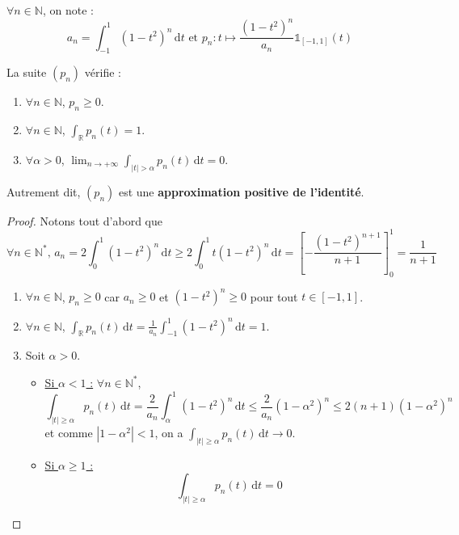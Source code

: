 






  \begin{notation}
    $\forall n \in \mathbb{N}$, on note :
    \[ a_n = \int_{-1}^1 (1-t^2)^n \, \mathrm{d}t \text{ et } p_n : t \mapsto \frac{(1-t^2)^n}{a_n} \mathbb{1}_{[-1, 1]}(t) \]
  \end{notation}

  \begin{lemma}
    \label{theoreme-de-weierstrass-par-la-convolution-1}
    La suite $(p_n)$ vérifie :
    \begin{enumerate}[label={\bfseries(\roman*)}]
      \item $\forall n \in \mathbb{N}$, $p_n \geq 0$.
      \item $\forall n \in \mathbb{N}$, $\int_{\mathbb{R}} p_n(t) = 1$.
      \item \label{theoreme-de-weierstrass-par-la-convolution-2} $\forall \alpha > 0$, $\lim_{n \rightarrow +\infty} \int_{|t| > \alpha} p_n(t) \, \mathrm{d}t = 0$.
    \end{enumerate}
    Autrement dit, $(p_n)$ est une \textbf{approximation positive de l'identité}.
  \end{lemma}

  \begin{proof}
    Notons tout d'abord que
    \[ \forall n \in \mathbb{N}^*, \, a_n = 2 \int_0^1 (1-t^2)^n \, \mathrm{d}t \geq 2 \int_0^1 t (1-t^2)^n \, \mathrm{d}t = \left[ - \frac{(1-t^2)^{n+1}}{n+1} \right]_0^1 = \frac{1}{n+1}  \]
    \begin{enumerate}[label={\bfseries(\roman*)}]
      \item $\forall n \in \mathbb{N}$, $p_n \geq 0$ car $a_n \geq 0$ et $(1-t^2)^n \geq 0$ pour tout $t \in [-1, 1]$.
      \item $\forall n \in \mathbb{N}$, $\int_{\mathbb{R}} p_n(t) \, \mathrm{d}t = \frac{1}{a_n} \int_{-1}^1 (1-t^2)^n \, \mathrm{d}t = 1$.
      \item Soit $\alpha > 0$.
      \begin{itemize}
        \item \uline{Si $\alpha < 1$ :} $\forall n \in \mathbb{N}^*$,
        \[ \int_{|t| \geq \alpha} p_n(t) \, \mathrm{d}t = \frac{2}{a_n} \int_\alpha^1 (1-t^2)^n \, \mathrm{d}t \leq \frac{2}{a_n} (1-\alpha^2)^n \leq 2(n+1)(1-\alpha^2)^n \]
        et comme $|1-\alpha^2| < 1$, on a $\int_{|t| \geq \alpha} p_n(t) \, \mathrm{d}t \longrightarrow 0$.
        \item \uline{Si $\alpha \geq 1$ :}
        \[ \int_{|t| \geq \alpha} p_n(t) \, \mathrm{d}t = 0 \]
      \end{itemize}
    \end{enumerate}
  \end{proof}

